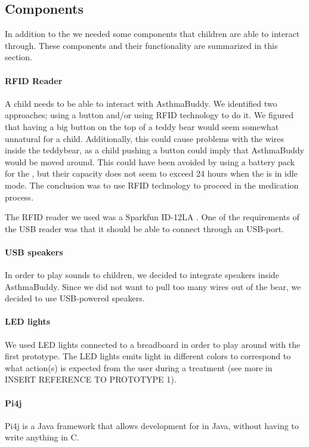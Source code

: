  
\subsection{Components}
In addition to the \rpi{} we needed some components that children are able to interact through. These components and their functionality are summarized in this section. 


\paragraph{RFID Reader}
A child needs to be able to interact with AsthmaBuddy. We identified two approaches; using a button and/or using RFID technology to do it. We figured that having a big button on the top of a teddy bear would seem somewhat unnatural for a child. Additionally, this could cause problems with the wires inside the teddybear, as a child pushing a button could imply that AsthmaBuddy would be moved around. This could have been avoided by using a battery pack for the \rpi{}, but their capacity does not seem to exceed 24 hours when the \rpi{} is in idle mode. The conclusion was to use RFID technology to proceed in the medication process.


The RFID reader we used was a Sparkfun ID-12LA . One of the requirements of the USB reader was that it should be able to connect through an USB-port. 
         
\paragraph{USB speakers}
In order to play sounds to children, we decided to integrate speakers inside AsthmaBuddy. Since we did not want to pull too many wires out of the bear, we decided to use USB-powered speakers.    

\paragraph{LED lights}
We used LED lights connected to a breadboard in order to play around with the first prototype. The LED lights emits light in different colors to correspond to what action(s) is expected from the user during a treatment (see more in INSERT REFERENCE TO PROTOTYPE 1).

\paragraph{Pi4j}
Pi4j is a Java framework that allows development for \rpi{} in Java, without having to write anything in C. 


